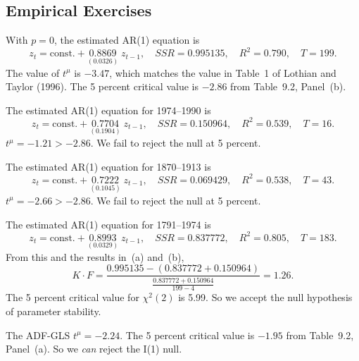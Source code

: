 \begin{answers}
\subsection*{Empirical Exercises}

With $p = 0$, the estimated AR(1) equation is
\[
z_t = \text{const.} + \underset{(0.0326)}{0.8869}\; z_{t-1}, \quad
SSR = 0.995135, \quad R^2 = 0.790, \quad T = 199.
\]
The value of $t^\mu$ is $-3.47$, which matches the value in Table~1 of Lothian and
Taylor (1996). The 5 percent critical value is $-2.86$ from Table~9.2, Panel~(b).

The estimated AR(1) equation for 1974--1990 is
\[
z_t = \text{const.} + \underset{(0.1904)}{0.7704}\; z_{t-1}, \quad
SSR = 0.150964, \quad R^2 = 0.539, \quad T = 16.
\]
$t^\mu = -1.21 > -2.86$. We fail to reject the null at 5 percent.

The estimated AR(1) equation for 1870--1913 is
\[
z_t = \text{const.} + \underset{(0.1045)}{0.7222}\; z_{t-1}, \quad
SSR = 0.069429, \quad R^2 = 0.538, \quad T = 43.
\]
$t^\mu = -2.66 > -2.86$. We fail to reject the null at 5 percent.

The estimated AR(1) equation for 1791--1974 is
\[
z_t = \text{const.} + \underset{(0.0329)}{0.8993}\; z_{t-1}, \quad
SSR = 0.837772, \quad R^2 = 0.805, \quad T = 183.
\]
From this and the results in~(a) and~(b),
\[
K \cdot F = \frac{0.995135 - (0.837772 + 0.150964)}{\frac{0.837772 + 0.150964}{199 - 4}}
= 1.26.
\]
The 5 percent critical value for $\chi^2(2)$ is 5.99. So we accept the null hypothesis
of parameter stability.

The ADF-GLS $t^\mu = -2.24$. The 5 percent critical value is $-1.95$ from Table~9.2, Panel~(a). So we \emph{can} reject the I(1) null.

\end{answers}
